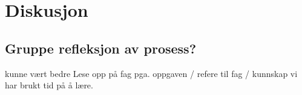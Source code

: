 \section{Diskusjon}

\subsection{Gruppe refleksjon av prosess?}
kunne vært bedre
Lese opp på fag pga. oppgaven / refere til fag / kunnskap vi har brukt tid på å lære. 

